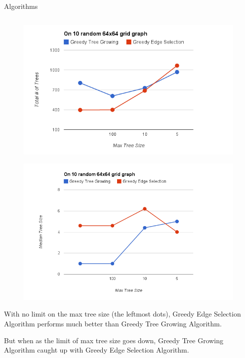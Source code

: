\documentclass[serif,mathserif,final]{beamer}
\begin{document}
\begin{frame}{}
\begin{columns}[t]
\begin{column}{0.49\linewidth}
\begin{block}{Algorithms}
\begin{columns}[t]
\begin{column}{0.49\linewidth}
\begin{figure}
	\centering
	\includegraphics[width=\columnwidth]{TotalTrees-Vs-MaxTreeSize.png}
\end{figure}
\vspace{-0.4in}
\begin{figure}
	\centering
	\includegraphics[width=\columnwidth]{MedianTreeSize-Vs-MaxTreeSize.png}
\end{figure}
\vspace{-0.4in}

			
			With no limit on the max tree size (the leftmost dots),
			Greedy Edge Selection Algorithm performs much better than
			Greedy Tree Growing Algorithm. 

			But when as the limit of max tree size goes down, Greedy
			Tree Growing Algorithm caught up with Greedy Edge
			Selection Algorithm.
			\end{column}
		\end{columns}


\end{block}
\end{column}
\end{columns}
\end{frame}
\end{document}
